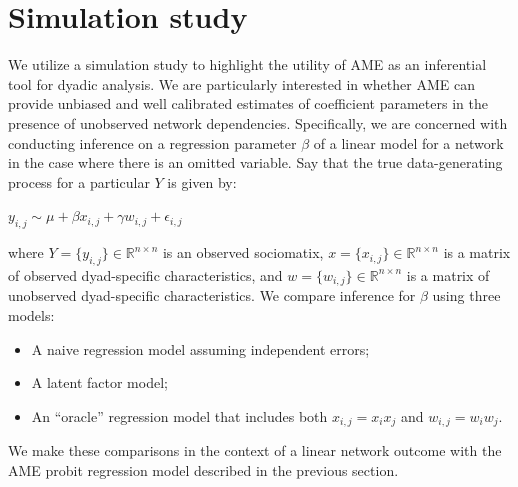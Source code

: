 \section{Simulation study}

We utilize a simulation study to highlight the utility of AME as an inferential tool for dyadic analysis. We are particularly interested in whether AME can provide unbiased and well calibrated estimates of coefficient parameters in the presence of unobserved network dependencies. Specifically, we are concerned with conducting inference on a regression parameter $\beta$ of a linear model for a network in the case where there is an omitted variable. Say that the true data-generating process for a particular $Y$ is given by:

$y_{i,j} \sim  \mu + \beta x_{i,j} + \gamma w_{i,j} + \epsilon_{i,j} $

where $Y= \{y_{i,j}\}\in \mathbb R^{n\times n}$ is an observed sociomatix, $x = \{x_{i,j} \} \in \mathbb R^{n \times n}$ is a matrix of observed dyad-specific characteristics, and $w = \{ w_{i,j}\} \in \mathbb R^{n \times n}$ is a matrix of unobserved dyad-specific characteristics. We compare inference for $\beta$ using three models:

\begin{itemize}
	\item A naive regression model assuming independent errors; 
	\item A latent factor model; 
	\item An ``oracle'' regression model that includes both $x_{i,j}=x_i x_j$ and $w_{i,j}=w_i w_j$. 
\end{itemize}

We make these comparisons in the context of a linear network outcome with the AME probit regression model described in the previous section. 

